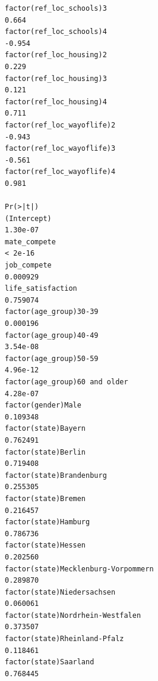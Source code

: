 \documentclass[
]{article}
\begin{document}
\begin{table}
\begin{minipage}[t]{\linewidth}
{\begin{verbatim}
factor(ref_loc_schools)3                                                            0.664
factor(ref_loc_schools)4                                                           -0.954
factor(ref_loc_housing)2                                                            0.229
factor(ref_loc_housing)3                                                            0.121
factor(ref_loc_housing)4                                                            0.711
factor(ref_loc_wayoflife)2                                                         -0.943
factor(ref_loc_wayoflife)3                                                         -0.561
factor(ref_loc_wayoflife)4                                                          0.981
                                                                                  Pr(>|t|)
(Intercept)                                                                       1.30e-07
mate_compete                                                                       < 2e-16
job_compete                                                                       0.000929
life_satisfaction                                                                 0.759074
factor(age_group)30-39                                                            0.000196
factor(age_group)40-49                                                            3.54e-08
factor(age_group)50-59                                                            4.96e-12
factor(age_group)60 and older                                                     4.28e-07
factor(gender)Male                                                                0.109348
factor(state)Bayern                                                               0.762491
factor(state)Berlin                                                               0.719408
factor(state)Brandenburg                                                          0.255305
factor(state)Bremen                                                               0.216457
factor(state)Hamburg                                                              0.786736
factor(state)Hessen                                                               0.202560
factor(state)Mecklenburg-Vorpommern                                               0.289870
factor(state)Niedersachsen                                                        0.060061
factor(state)Nordrhein-Westfalen                                                  0.373507
factor(state)Rheinland-Pfalz                                                      0.118461
factor(state)Saarland                                                             0.768445

\end{verbatim}}
\end{minipage}
\end{table}
\end{document}

